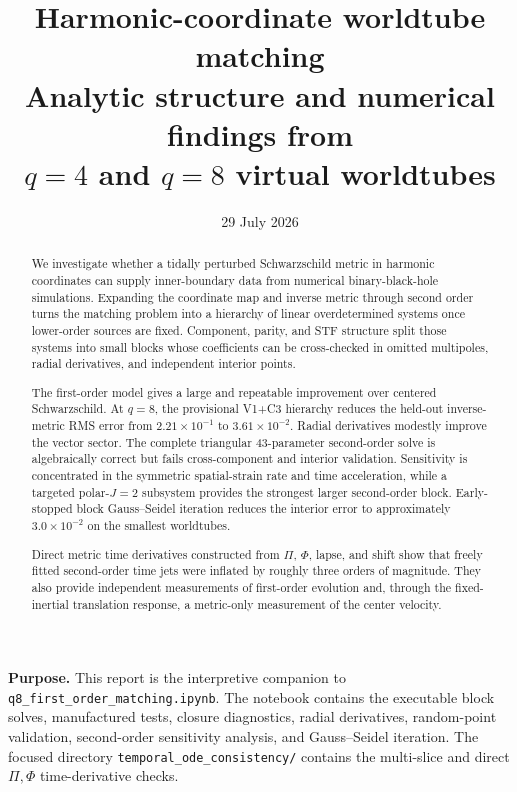 \documentclass[11pt]{article}
\title{\vspace{-1.4cm}
  \textbf{\color{ink}Harmonic-coordinate worldtube matching}\\[0.35em]
  \large Analytic structure and numerical findings from\\
  \(q=4\) and \(q=8\) virtual worldtubes}
\author{}
\date{29 July 2026}
\begin{document}
\maketitle
\vspace{-1.2em}

\begin{center}
\begin{minipage}{0.92\textwidth}
\colorbox{paleBlue}{%
\parbox{\dimexpr\linewidth-2\fboxsep\relax}{%
\textbf{Purpose.}
This report is the interpretive companion to
\texttt{q8\_first\_order\_matching.ipynb}.  The notebook contains the
executable block solves, manufactured tests, closure diagnostics, radial
derivatives, random-point validation, second-order sensitivity analysis, and
Gauss--Seidel iteration.  The focused directory
\texttt{temporal\_ode\_consistency/} contains the multi-slice and direct
\(\Pi,\Phi\) time-derivative checks.
}}
\end{minipage}
\end{center}

\begin{abstract}
We investigate whether a tidally perturbed Schwarzschild metric in harmonic
coordinates can supply inner-boundary data from numerical binary-black-hole
simulations.  Expanding the coordinate map and inverse metric through second
order turns the matching problem into a hierarchy of linear overdetermined
systems once lower-order sources are fixed.  Component, parity, and STF
structure split those systems into small blocks whose coefficients can be
cross-checked in omitted multipoles, radial derivatives, and independent
interior points.

The first-order model gives a large and repeatable improvement over centered
Schwarzschild.  At \(q=8\), the provisional V1+C3 hierarchy reduces the
held-out inverse-metric RMS error from \(2.21\times10^{-1}\) to
\(3.61\times10^{-2}\).  Radial derivatives modestly improve the vector
sector.  The complete triangular 43-parameter second-order solve is
algebraically correct but fails cross-component and interior validation.
Sensitivity is concentrated in the symmetric spatial-strain rate and time
acceleration, while a targeted polar-\(J=2\) subsystem provides the strongest
larger second-order block.  Early-stopped block Gauss--Seidel iteration
reduces the interior error to approximately \(3.0\times10^{-2}\) on the
smallest worldtubes.

Direct metric time derivatives constructed from \(\Pi\), \(\Phi\), lapse,
and shift show that freely fitted second-order time jets were inflated by
roughly three orders of magnitude.  They also provide independent
measurements of first-order evolution and, through the fixed-inertial
translation response, a metric-only measurement of the center velocity.
\end{abstract}
\end{document}
